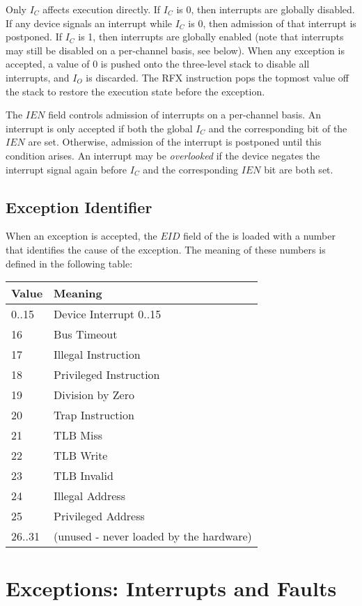 Only $I_C$ affects execution directly. If $I_C$ is 0, then interrupts are globally disabled. If any device signals an interrupt while $I_C$ is 0, then admission of that interrupt is postponed. If $I_C$ is 1, then interrupts are globally enabled (note that interrupts may still be disabled on a per-channel basis, see below). When any exception is accepted, a value of 0 is pushed onto the three-level stack to disable all interrupts, and $I_O$ is discarded. The RFX instruction pops the topmost value off the stack to restore the execution state before the exception.

The $IEN$ field controls admission of interrupts on a per-channel basis. An interrupt is only  accepted if both the global $I_C$ and the corresponding bit of the $IEN$ are set. Otherwise, admission of the interrupt is postponed until this condition arises. An interrupt may be {\it overlooked} if the device negates the interrupt signal again before $I_C$ and the corresponding $IEN$ bit are both set.

\subsection{Exception Identifier}

When an exception is accepted, the $EID$ field of the \psw is loaded with a number that identifies the cause of the exception. The meaning of these numbers is defined in the following table:

\begin{tabular}{|l|l|}
\hline
Value & Meaning \\
\hline
0..15 & Device Interrupt 0..15\\
16 & Bus Timeout\\
17 & Illegal Instruction\\
18 & Privileged Instruction\\
19 & Division by Zero\\
20 & Trap Instruction\\
21 & TLB Miss\\
22 & TLB Write\\
23 & TLB Invalid\\
24 & Illegal Address\\
25 & Privileged Address\\
26..31 & (unused - never loaded by the hardware)\\
\hline
\end{tabular}

\section{Exceptions: Interrupts and Faults}

